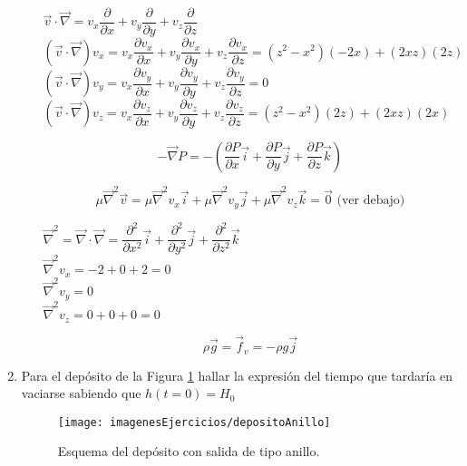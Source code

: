 \begin{enumerate}
\begin{enumerate}
		$\vec{v} \cdot \vec{\nabla} = 
			v_x \dfrac{\partial}{\partial x} + 
			v_y \dfrac{\partial}{\partial y} + 
			v_z \dfrac{\partial}{\partial z}
		$\\
		
		$(\vec{v} \cdot \vec{\nabla})v_x = 
			v_x \dfrac{\partial v_x}{\partial x} + 
			v_y \dfrac{\partial v_x}{\partial y} + 
			v_z \dfrac{\partial v_x}{\partial z} =
			(z^2 - x^2)(-2x) + (2xz)(2z)
		$\\
		
		$(\vec{v} \cdot \vec{\nabla})v_y = 
			v_x \dfrac{\partial v_y}{\partial x} + 
			v_y \dfrac{\partial v_y}{\partial y} + 
			v_z \dfrac{\partial v_y}{\partial z} =
			0
		$\\
		
		$(\vec{v} \cdot \vec{\nabla})v_z = 
			v_x \dfrac{\partial v_z}{\partial x} + 
			v_y \dfrac{\partial v_z}{\partial y} + 
			v_z \dfrac{\partial v_z}{\partial z} =
			(z^2 - x^2)(2z) + (2xz)(2x)
		$
		
		\[-\vec{\nabla} P = -\left(
			\dfrac{\partial P}{\partial x} \vec{i} +
			\dfrac{\partial P}{\partial y} \vec{j} +
			\dfrac{\partial P}{\partial z} \vec{k}
			\right)
		\]	
		
		\[
			\mu \vec{\nabla}^2 \vec{v} =
				\mu \vec{\nabla}^2 v_x \vec{i} + 
				\mu \vec{\nabla}^2 v_y \vec{j} + 
				\mu \vec{\nabla}^2 v_z \vec{k} =
				\vec{0} \text{ (ver debajo)}
		\]
		
		$\vec{\nabla}^2 = \vec{\nabla} \cdot \vec{\nabla} = 
			\dfrac{\partial^2}{\partial x^2} \vec{i} +
			\dfrac{\partial^2}{\partial y^2} \vec{j} +
			\dfrac{\partial^2}{\partial z^2} \vec{k}
		$\\
		
		$\vec{\nabla}^2 v_x = -2 + 0 + 2 = 0$\\
		$\vec{\nabla}^2 v_y = 0$\\
		$\vec{\nabla}^2 v_z = 0 + 0 + 0 = 0$
		
		\[\rho \vec{g} = \vec{f}_v = -\rho g \vec{j}\]
		
\end{enumerate}


\black
\newpage
\item Para el depósito de la Figura \ref{fig:depositoAnillo} hallar la expresión del tiempo que tardaría en vaciarse sabiendo que $h(t = 0) = H_0$

\begin{figure}[H]
	\centering
	\texttt{[image: imagenesEjercicios/depositoAnillo]}
	\caption{Esquema del depósito con salida de tipo anillo.}
	\label{fig:depositoAnillo}
\end{figure}


\end{enumerate}

